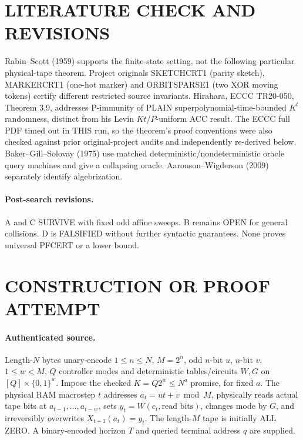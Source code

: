 \documentclass[11pt]{article}
\begin{document}
\section{LITERATURE CHECK AND REVISIONS}
Rabin--Scott (1959) supports the finite-state setting, not the following particular physical-tape theorem. Project originals SKETCHCRT1 (parity sketch), MARKERCRT1 (one-hot marker) and ORBITSPARSE1 (two XOR moving tokens) certify different restricted source invariants. Hirahara, ECCC TR20-050, Theorem 3.9, addresses P-immunity of PLAIN superpolynomial-time-bounded $K^t$ randomness, distinct from his Levin $Kt$/$P$-uniform ACC result. The ECCC full PDF timed out in THIS run, so the theorem's proof conventions were also checked against prior original-project audits and independently re-derived below. Baker--Gill--Solovay (1975) use matched deterministic/nondeterministic oracle query machines and give a collapsing oracle. Aaronson--Wigderson (2009) separately identify algebrization.
\paragraph{Post-search revisions.} A and C SURVIVE with fixed odd affine sweeps. B remains OPEN for general collisions. D is FALSIFIED without further syntactic guarantees. None proves universal PFCERT or a lower bound.

\section{CONSTRUCTION OR PROOF ATTEMPT}
\paragraph{Authenticated source.} Length-$N$ bytes unary-encode $1\le n\le N$, $M=2^n$, odd $n$-bit $u$, $n$-bit $v$, $1\le w<M$, $Q$ controller modes and deterministic tables/circuits $W,G$ on $[Q]\times\{0,1\}^w$. Impose the checked $K=Q2^w\le N^a$ promise, for fixed $a$. The physical RAM macrostep $t$ addresses $a_t=ut+v\bmod M$, physically reads actual tape bits at $a_{t-1},\ldots,a_{t-w}$, sets $y_t=W(c_t,\text{read bits})$, changes mode by $G$, and irreversibly overwrites $X_{t+1}(a_t)=y_t$. The length-$M$ tape is initially ALL ZERO. A binary-encoded horizon $T$ and queried terminal address $q$ are supplied.
\end{document}
